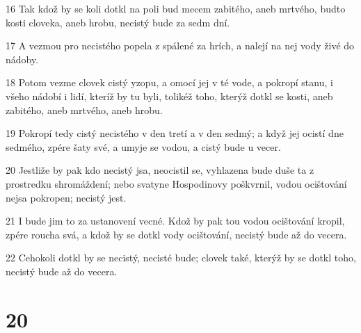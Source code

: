 \par 16 Tak kdož by se koli dotkl na poli bud mecem zabitého, aneb mrtvého, budto kosti cloveka, aneb hrobu, necistý bude za sedm dní.
\par 17 A vezmou pro necistého popela z spálené za hrích, a nalejí na nej vody živé do nádoby.
\par 18 Potom vezme clovek cistý yzopu, a omocí jej v té vode, a pokropí stanu, i všeho nádobí i lidí, kteríž by tu byli, tolikéž toho, kterýž dotkl se kosti, aneb zabitého, aneb mrtvého, aneb hrobu.
\par 19 Pokropí tedy cistý necistého v den tretí a v den sedmý; a když jej ocistí dne sedmého, zpére šaty své, a umyje se vodou, a cistý bude u vecer.
\par 20 Jestliže by pak kdo necistý jsa, neocistil se, vyhlazena bude duše ta z prostredku shromáždení; nebo svatyne Hospodinovy poškvrnil, vodou ocištování nejsa pokropen; necistý jest.
\par 21 I bude jim to za ustanovení vecné. Kdož by pak tou vodou ocištování kropil, zpére roucha svá, a kdož by se dotkl vody ocištování, necistý bude až do vecera.
\par 22 Cehokoli dotkl by se necistý, necisté bude; clovek také, kterýž by se dotkl toho, necistý bude až do vecera.

\chapter{20}

